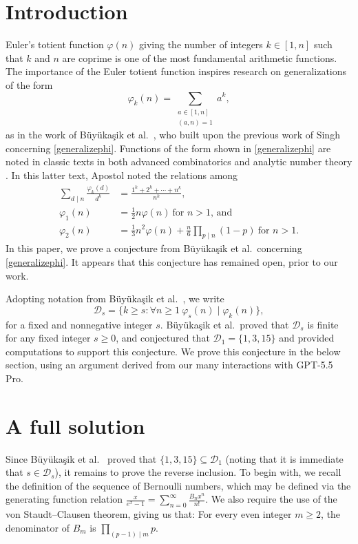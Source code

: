 \documentclass[12pt]{article}
\begin{document}
\section{Introduction}
 Euler's totient function $\varphi(n)$ giving the number of integers $k \in [1, n]$ such that $k$ and $n$ are coprime is one of the most 
 fundamental arithmetic functions. The importance of the Euler totient function inspires research on generalizations of the form
\begin{equation}\label{generalizephi} 
 \varphi_{k}(n) = \sum_{\substack{ a \in [1, n] \\ (a, n) = 1 }} a^k, 
\end{equation}
 as in the work of B\"uy\"uka\c sik et al.\ \cite{BuyukasikGoralSertbas2024}, who built upon the previous work of Singh \cite{Singh2009} 
 concerning \eqref{generalizephi}. Functions of the form shown in \eqref{generalizephi} are noted in classic texts in both advanced 
 combinatorics \cite[p.\ 199]{Comtet1974} and analytic number theory \cite[p.\ 48]{Apostol1976}. In this latter text, Apostol noted 
 the relations among 
\begin{align}
 \sum_{d \mid n} \frac{ \varphi_k(d) }{d^k} & = \frac{1^k + 2^k + \cdots + n^k}{n^k}, \nonumber \\ 
 \varphi_1(n) & = \frac{1}{2} n \varphi(n) \ \text{for $n > 1$, and} \label{phi1eval} \\
 \varphi_2(n) & = \frac{1}{3} n^2 \varphi(n) + \frac{n}{6} \prod_{p \mid n} (1-p) \ \text{for $n > 1$.} \nonumber 
\end{align}
 In this paper, we prove a conjecture from B\"uy\"uka\c sik et al.\ concerning \eqref{generalizephi}. It appears that this conjecture has 
 remained open, prior to our work. 

 Adopting notation from B\"uy\"uka\c sik et al.\ \cite{BuyukasikGoralSertbas2024}, we write $$ \mathcal{D}_{s} = \{ k \geq s : \forall n 
 \geq 1 \ \varphi_{s}(n) \mid \varphi_k(n) \}, $$ for a fixed and nonnegative integer $s$. B\"uy\"uka\c sik et al.\ proved that 
 $\mathcal{D}_{s}$ is finite for any fixed integer $s \geq 0$, 
 and conjectured that $\mathcal{D}_{1} = \{ 1, 3, 15 \}$
 and provided computations to support this conjecture. We prove this conjecture in the below section, 
 using an argument derived from our many interactions with GPT-5.5 Pro. 

\section{A full solution}
 Since B\"{u}y\"{u}ka\c{s}ik et al.\ \cite[Theorem 2(2)]{BuyukasikGoralSertbas2024} proved that $ \{ 1, 3, 15 \} \subseteq \mathcal{D}_{1}$ 
 (noting that it is immediate that $s \in \mathcal{D}_{s}$), it remains to prove the reverse inclusion. To begin with, we recall the definition 
 of the sequence of Bernoulli numbers, which may be defined via the generating function relation $ \frac{x}{e^{x} - 1} = \sum_{n = 
 0}^{\infty} \frac{B_{n} x^n}{n!}$. We also require the use of the von Staudt--Clausen theorem, giving us that: For every even integer $m 
 \geq 2$, the denominator of $B_{m}$ is $\prod_{(p-1) \mid m} p$. 
\end{document}
